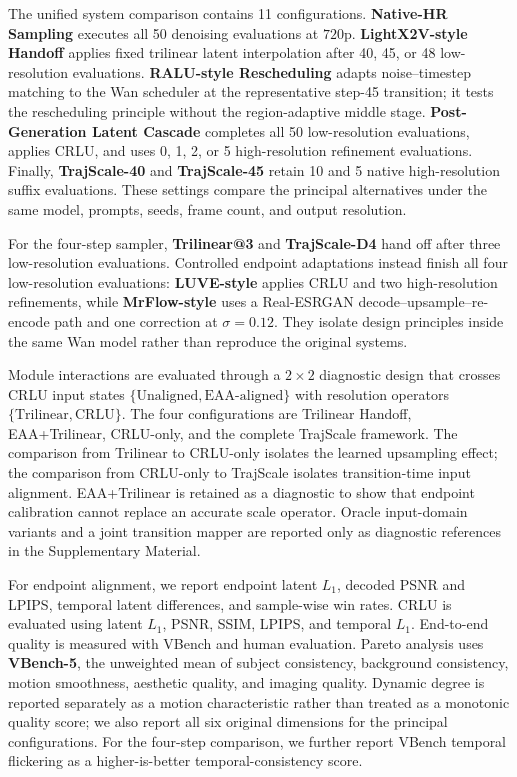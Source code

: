 The unified system comparison contains 11 configurations. \textbf{Native-HR
Sampling} executes all 50 denoising evaluations at \(720\text{p}\).
\textbf{LightX2V-style Handoff} applies fixed trilinear latent interpolation
after 40, 45, or 48 low-resolution evaluations. \textbf{RALU-style
Rescheduling} adapts noise--timestep matching to the Wan scheduler at the
representative step-45 transition; it tests the rescheduling principle without
the region-adaptive middle stage. \textbf{Post-Generation Latent Cascade}
completes all 50 low-resolution evaluations, applies CRLU, and uses 0, 1, 2,
or 5 high-resolution refinement evaluations. Finally, \textbf{TrajScale-40}
and \textbf{TrajScale-45} retain 10 and 5 native high-resolution suffix
evaluations. These settings compare the principal alternatives under the same
model, prompts, seeds, frame count, and output resolution.

For the four-step sampler, \textbf{Trilinear@3} and
\textbf{TrajScale-D4} hand off after three low-resolution evaluations.
Controlled endpoint adaptations instead finish all four low-resolution
evaluations: \textbf{LUVE-style} \citep{zhao2026luve} applies CRLU and two
high-resolution refinements, while \textbf{MrFlow-style}
\citep{zheng2026mrflow} uses a Real-ESRGAN decode--upsample--re-encode path and
one correction at \(\sigma=0.12\). They isolate design principles inside the
same Wan model rather than reproduce the original systems.

Module interactions are evaluated through a \(2\times2\) diagnostic design
that crosses CRLU input states
\(\{\text{Unaligned},\text{EAA-aligned}\}\) with resolution operators
\(\{\text{Trilinear},\text{CRLU}\}\). The four configurations are
Trilinear Handoff, EAA+Trilinear, CRLU-only, and the complete TrajScale
framework. The comparison from Trilinear to CRLU-only isolates the learned
upsampling effect; the comparison from CRLU-only to TrajScale isolates
transition-time input alignment. EAA+Trilinear is retained as a diagnostic to
show that endpoint calibration cannot replace an accurate scale operator.
Oracle input-domain variants and a joint transition mapper are reported only as
diagnostic references in the Supplementary Material.

For endpoint alignment, we report endpoint latent \(L_1\), decoded PSNR and
LPIPS, temporal latent differences, and sample-wise win rates. CRLU is evaluated
using latent \(L_1\), PSNR, SSIM, LPIPS, and temporal \(L_1\). End-to-end
quality is measured with VBench \citep{huang2024vbench} and human evaluation.
Pareto analysis uses \textbf{VBench-5}, the unweighted mean of subject
consistency, background consistency, motion smoothness, aesthetic quality, and
imaging quality. Dynamic degree is reported separately as a motion
characteristic rather than treated as a monotonic quality score; we also
report all six original dimensions for the principal configurations. For the
four-step comparison, we further report VBench temporal flickering as a
higher-is-better temporal-consistency score.

